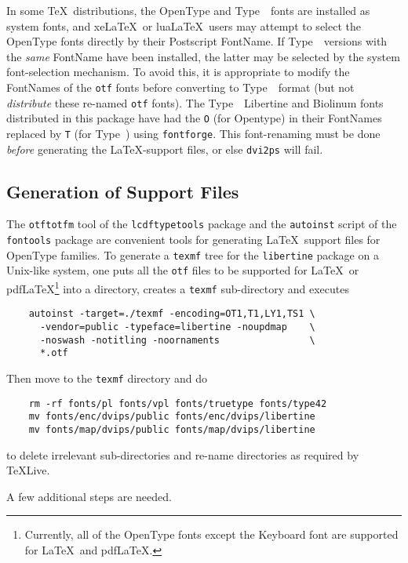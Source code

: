 \documentclass[11pt]{article}
\newcommand{\typeone}{Type~\liningnums{1}}
\begin{document}
In some \TeX\ distributions, the OpenType and \typeone\ fonts are installed as system fonts,
and xe\LaTeX\ or lua\LaTeX\ users may attempt to select the OpenType fonts directly by 
their Postscript FontName.  If \typeone\ versions with the \emph{same} FontName
have been installed, the latter may be selected by the system font-selection
mechanism.  To avoid this, it is appropriate to modify the
FontNames of the \texttt{otf} fonts before converting to \typeone\ 
format (but not \emph{distribute} these re-named \texttt{otf} fonts).
The \typeone\  Libertine and Biolinum fonts distributed in this
package have had the \texttt{O} (for Opentype) in their FontNames replaced by 
\texttt{T} 
(for Type~) using \texttt{fontforge}.  This font-renaming
must be done \emph{before} generating the \LaTeX-support files, or else
\texttt{dvi2ps} will fail.


\subsection{Generation of Support Files}

The \texttt{otftotfm} tool of the \texttt{lcdftypetools}
package and the \texttt{autoinst} script of the \texttt{fontools} package are convenient tools
for generating \LaTeX\ support files for OpenType families. 
To generate a \texttt{texmf} tree for the \texttt{libertine}
package on a Unix-like system, one puts all the \texttt{otf} files to be supported for \LaTeX\ or
pdf\LaTeX\footnote{Currently, all of the OpenType fonts except the Keyboard font are supported
for \LaTeX\ and pdf\LaTeX.} into a directory, creates a \texttt{texmf} sub-directory  and executes
\begin{verbatim}
    autoinst -target=./texmf -encoding=OT1,T1,LY1,TS1 \
      -vendor=public -typeface=libertine -noupdmap    \
      -noswash -notitling -noornaments                \
      *.otf
\end{verbatim}
Then move to the \texttt{texmf} directory and do
\begin{verbatim}
    rm -rf fonts/pl fonts/vpl fonts/truetype fonts/type42
    mv fonts/enc/dvips/public fonts/enc/dvips/libertine
    mv fonts/map/dvips/public fonts/map/dvips/libertine
\end{verbatim}
to delete irrelevant sub-directories and re-name directories as required by
TeXLive.

A few additional steps are needed.
\end{document}
